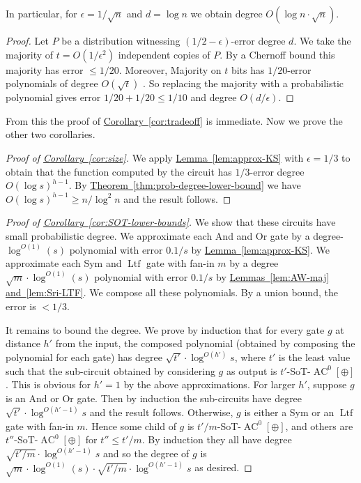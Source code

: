 \documentclass[11pt]{article}
\newcommand{\expref}[2]{\texorpdfstring{\hyperref[#2]{#1~\ref{#2}}}{#1~\ref{#2}}}
\DeclareMathOperator{\Ltf}{\mathrm{Ltf}}  %
\DeclareMathOperator{\AC}{\mathrm{AC}}  %
\newcommand{\e}{\epsilon}
\begin{document}
In particular, for $\e=1/\sqrt{n}$ and $d=\log n$ we obtain degree
$O(\log n\cdot\sqrt{n})$.
\begin{proof}
Let $P$ be a distribution witnessing $(1/2-\e)$-error degree $d$.
We take the majority of $t=O(1/\e^{2})$ independent copies of $P$.
By a Chernoff bound this majority has error $\le1/20$. Moreover,
Majority on $t$ bits has $1/20$-error polynomials of degree $O(\sqrt{t})$
\cite{DBLP:conf/focs/AlmanW15}. So replacing the majority with a
probabilistic polynomial gives error $1/20+1/20\le1/10$ and degree
$O(d/\e)$.
\end{proof}
From this the proof of \expref{Corollary}{cor:tradeoff} is immediate.
Now we prove the other two corollaries.
\begin{proof}[Proof of \expref{Corollary}{cor:size}]
	We apply \expref{Lemma}{lem:approx-KS}
with $\e=1/3$ to obtain that the function computed by the circuit
has $1/3$-error degree $O(\log s)^{h-1}$. By \expref{Theorem}{thm:prob-degree-lower-bound}
we have $O(\log s)^{h-1}\ge n/\log^{2}n$ and the result follows.
\end{proof}
%
\begin{proof}[Proof of \expref{Corollary}{cor:SOT-lower-bounds}] We show that these
circuits have small probabilistic degree. We approximate each And
and Or gate by a degree-$\log^{O(1)}(s)$ polynomial with error $0.1/s$
by \expref{Lemma}{lem:approx-KS}. We approximate each Sym and $\Ltf$ gate
with fan-in $m$ by a degree $\sqrt{m}\cdot\log^{O(1)}(s)$ polynomial
with error $0.1/s$ by \expref{Lemmas}{lem:AW-maj} \expref{and}{lem:Sri-LTF}.
We compose all these polynomials. By a union bound, the error is $<1/3$.

It remains to bound the degree. We prove by induction that for every
gate $g$ at distance $h'$ from the input, the composed polynomial
(obtained by composing the polynomial for each gate) has degree $\sqrt{t'}\cdot\log^{O(h')}s$,
where $t'$ is the least value such that the sub-circuit obtained
by considering $g$ as output is $t'$-SoT-$\AC^{0}[\oplus]$. This
is obvious for $h'=1$ by the above approximations. For larger $h'$,
suppose $g$ is an And or Or gate. Then by induction the sub-circuits
have degree $\sqrt{t'}\cdot\log^{O(h'-1)}s$ and the result follows.
Otherwise, $g$ is either a Sym or an $\Ltf$ gate with fan-in $m$. Hence
some child of $g$ is $t'/m$-SoT-$\AC^{0}[\oplus]$, and others are
$t''$-SoT-$\AC^{0}[\oplus]$ for $t''\le t'/m$. By induction they
all have degree $\sqrt{t'/m}\cdot\log^{O(h'-1)}s$ and so the degree
of $g$ is $\sqrt{m}\cdot\log^{O(1)}(s)\cdot\sqrt{t'/m}\cdot\log^{O(h'-1)}s$
as desired.
\end{proof}
\end{document}

